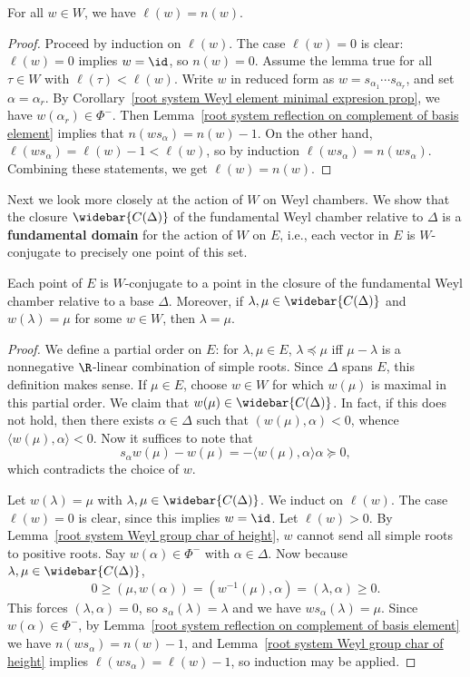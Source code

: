 \begin{proposition}\label{root system Weyl group char of height}
For all $w\in W$, we have $\ell(w)=n(w)$.
\end{proposition}
\begin{proof}
Proceed by induction on $\ell(w)$. The case $\ell(w)=0$ is clear: $\ell(w)=0$ implies $w=\id$, so $n(w)=0$. Assume the lemma true for all $\tau\in W$ with $\ell(\tau)<\ell(w)$. Write $w$ in reduced form as $w=s_{\alpha_1}\cdots s_{\alpha_r}$, and set $\alpha=\alpha_r$. By Corollary~\ref{root system Weyl element minimal expresion prop}, we have $w(\alpha_r)\in\Phi^-$. Then Lemma~\ref{root system reflection on complement of basis element} implies that $n(ws_\alpha)=n(w)-1$. On the other hand, $\ell(ws_\alpha)=\ell(w)-1<\ell(w)$, so by induction $\ell(ws_\alpha)=n(ws_\alpha)$. Combining these statements, we get $\ell(w)=n(w)$.
\end{proof}
Next we look more closely at the action of $W$ on Weyl chambers. We show that the closure $\widebar{C(\Delta)}$ of the fundamental Weyl chamber relative to $\Delta$ is a \textbf{fundamental domain} for the action of $W$ on $E$, i.e., each vector in $E$ is $W$-conjugate to precisely one point of this set.
\begin{proposition}\label{root system fundamental domain of Weyl group}
Each point of $E$ is $W$-conjugate to a point in the closure of the fundamental Weyl chamber relative to a base $\Delta$. Moreover, if $\lambda,\mu\in\widebar{C(\Delta)}$ and $w(\lambda)=\mu$ for some $w\in W$, then $\lambda=\mu$.
\end{proposition}
\begin{proof}
We define a partial order on $E$: for $\lambda,\mu\in E$, $\lambda\preceq\mu$ iff $\mu-\lambda$ is a nonnegative $\R$-linear combination of simple roots. Since $\Delta$ spans $E$, this definition makes sense. If $\mu\in E$, choose $w\in W$ for which $w(\mu)$ is maximal in this partial order. We claim that $w(\mu)\in\widebar{C(\Delta)}$. In fact, if this does not hold, then there exists $\alpha\in\Delta$ such that $(w(\mu),\alpha)<0$, whence $\langle w(\mu),\alpha\rangle<0$. Now it suffices to note that
\[s_\alpha w(\mu)-w(\mu)=-\langle w(\mu),\alpha\rangle\alpha\succeq 0,\]
which contradicts the choice of $w$.\par
Let $w(\lambda)=\mu$ with $\lambda,\mu\in\widebar{C(\Delta)}$. We induct on $\ell(w)$. The case $\ell(w)=0$ is clear, since this implies $w=\id$. Let $\ell(w)>0$. By Lemma~\ref{root system Weyl group char of height}, $w$ cannot send all simple roots to positive roots. Say $w(\alpha)\in\Phi^-$ with $\alpha\in\Delta$. Now because $\lambda,\mu\in\widebar{C(\Delta)}$, 
\[0\geq(\mu,w(\alpha))=(w^{-1}(\mu),\alpha)=(\lambda,\alpha)\geq 0.\]
This forces $(\lambda,\alpha)=0$, so $s_\alpha(\lambda)=\lambda$ and we have $ws_\alpha(\lambda)=\mu$. Since $w(\alpha)\in\Phi^-$, by Lemma~\ref{root system reflection on complement of basis element} we have $n(ws_\alpha)=n(w)-1$, and Lemma~\ref{root system Weyl group char of height} implies $\ell(ws_\alpha)=\ell(w)-1$, so induction may be applied.
\end{proof}
